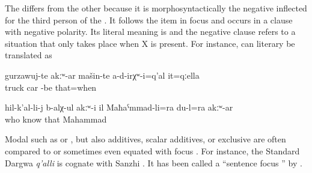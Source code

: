 The    differs from the other  because it is morphosyntactically the negative  inflected for the third person of the . It follows the item in focus and occurs in a clause with negative polarity. Its literal meaning is  and the negative clause refers to a situation that only takes place when X is present. For instance,  can literary be translated as 
%
\begin{exe}
	\ex	\label{ex:At that time there were only trucks constituents}
	\gll	gurzawuj-te	akːʷ-ar	mašin-te	a-d-irχʷ-i=q'al	it=qːella\\
		truck 		car	-be	that=when\\
	\glt	{} 

	\ex	\label{ex:‎Nobody knew it, only Mahammad and me}
	\gll	hil-k'al-li-j	b-alχ-ul	akːʷ-i	il	Maħaˁmmad-li=ra	du-l=ra	akːʷ-ar\\
		who know		that	Mahammad		\\
	\glt	{}
\end{exe}

Modal  such as  or , but also additives, scalar additives, or exclusive  are often compared to or sometimes even equated with focus . For instance, the Standard Dargwa  \textit{q'alli} is cognate with Sanzhi . It has been called a ``sentence focus '' by \citet[74]{vandenBerg2001}.

